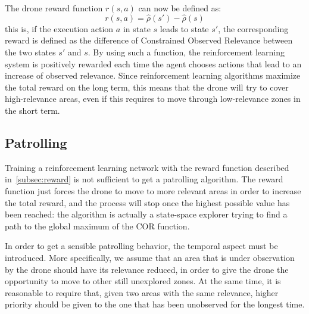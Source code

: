 \documentclass{article}
\begin{document}
The drone reward function $r(s,a)$ can now be defined as:
\begin{equation}
	r(s,a) = \hat{\rho}(s') - \hat{\rho}(s)
	\label{eq:correward}
\end{equation}
this is, if the execution action $a$ in state $s$ leads to state $s'$, the corresponding reward is defined as the difference of Constrained Observed Relevance between the two states $s'$ and $s$. By using such a function, the reinforcement learning system is positively rewarded each time the agent chooses actions that lead to an increase of observed relevance. Since reinforcement learning algorithms maximize the total reward on the long term, this means that the drone will try to cover high-relevance areas, even if this requires to move through low-relevance zones in the short term.

\subsection{Patrolling}
\label{subsec:patrolling}
Training a reinforcement learning network with the reward function described in~\ref{subsec:reward} is not sufficient to get a patrolling algorithm. The reward function just forces the drone to move to more relevant areas in order to increase the total reward, and the process will stop once the highest possible value has been reached: the algorithm is actually a state-space explorer trying to find a path to the global maximum of the COR function.

In order to get a sensible patrolling behavior, the temporal aspect must be introduced. More specifically, we assume that an area that is under observation by the drone should have its relevance reduced, in order to give the drone the opportunity to move to other still unexplored zones. At the same time, it is reasonable to require that, given two areas with the same relevance, higher priority should be given to the one that has been unobserved for the longest time. 
\end{document}
